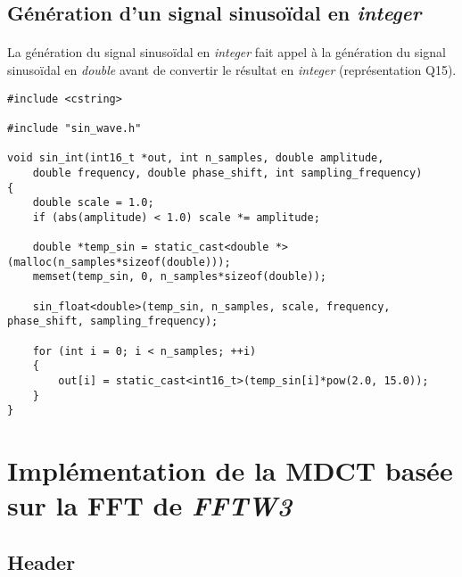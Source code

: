 \documentclass{article}
\begin{document}
\subsection{Génération d'un signal sinusoïdal en \emph{integer}}\label{app:run_ref_mdct_fint}
\paragraph{}
La génération du signal sinusoïdal en \emph{integer} fait appel à la génération du signal sinusoïdal en \emph{double} avant de convertir le résultat en \emph{integer} (représentation Q15).
\lstset{language=C++}
\begin{lstlisting}
#include <cstring>

#include "sin_wave.h"

void sin_int(int16_t *out, int n_samples, double amplitude,
    double frequency, double phase_shift, int sampling_frequency)
{
    double scale = 1.0;
    if (abs(amplitude) < 1.0) scale *= amplitude;

    double *temp_sin = static_cast<double *>(malloc(n_samples*sizeof(double)));
    memset(temp_sin, 0, n_samples*sizeof(double));

    sin_float<double>(temp_sin, n_samples, scale, frequency, phase_shift, sampling_frequency);

    for (int i = 0; i < n_samples; ++i)
    {
        out[i] = static_cast<int16_t>(temp_sin[i]*pow(2.0, 15.0));
    }
}
\end{lstlisting}




\newpage
\section{Implémentation de la MDCT basée sur la FFT de \emph{FFTW3}}\label{app:mdct_fftw3_f32}
\subsection{Header}\label{app:mdct_fftw3_f32_header}
\end{document}
